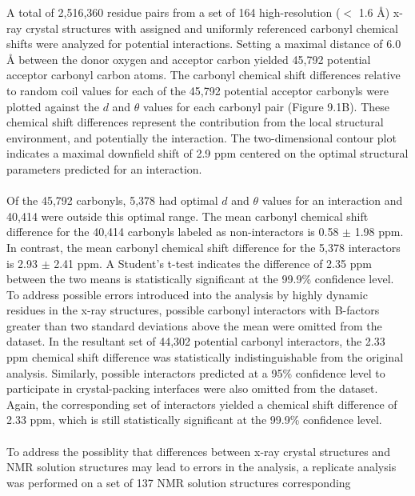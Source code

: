 \begin{doublespace}
A total of 2,516,360 residue pairs from a set of 164 high-resolution
($<$ 1.6 \r{A}) x-ray crystal structures with assigned and uniformly referenced
carbonyl \cnmr{} chemical shifts were analyzed for potential \npistar{}
interactions. Setting a maximal distance of 6.0 \r{A} between the donor oxygen
and acceptor carbon yielded 45,792 potential acceptor carbonyl carbon atoms.
The carbonyl \cnmr{} chemical shift differences relative to random coil values
for each of the 45,792 potential acceptor carbonyls were plotted against the
$d$ and $\theta$ values for each carbonyl pair (Figure 9.1B). These chemical
shift differences represent the contribution from the local structural
environment, and potentially the \npistar{} interaction. The two-dimensional
contour plot indicates a maximal downfield shift of 2.9 ppm centered on the
optimal structural parameters predicted for an \npistar{} interaction.
\\\\
Of the 45,792 carbonyls, 5,378 had optimal $d$ and $\theta$ values for an
\npistar{} interaction and 40,414 were outside this optimal range. The mean
carbonyl \cnmr{} chemical shift difference for the 40,414 carbonyls labeled as
non-interactors is 0.58 $\pm$ 1.98 ppm. In contrast, the mean carbonyl \cnmr{}
chemical shift difference for the 5,378 interactors is 2.93 $\pm$ 2.41 ppm. A
Student's t-test indicates the difference of 2.35 ppm between the two means is
statistically significant at the 99.9\% confidence level. To address possible
errors introduced into the analysis by highly dynamic residues in the x-ray
structures, possible carbonyl interactors with B-factors greater than two
standard deviations above the mean were omitted from the dataset. In the
resultant set of 44,302 potential carbonyl interactors, the 2.33 ppm chemical
shift difference was statistically indistinguishable from the original
analysis. Similarly, possible interactors predicted at a 95\% confidence level
to participate in crystal-packing interfaces were also omitted from the
dataset. Again, the corresponding set of interactors yielded a chemical shift
difference of 2.33 ppm, which is still statistically significant at the 99.9\%
confidence level.
\\\\
To address the possiblity that differences between x-ray crystal structures
and NMR solution structures may lead to errors in the analysis, a replicate
analysis was performed on a set of 137 NMR solution structures corresponding

\end{doublespace}
